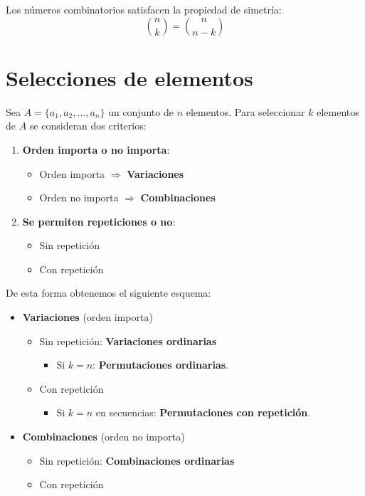 \documentclass[a4paper,12pt]{article}
\begin{document}
\begin{procedimiento}[title=Propiedad de simetría]
Los números combinatorios satisfacen la propiedad de simetría:
\[
\binom{n}{k} = \binom{n}{n-k}
\]
\end{procedimiento}

\section{Selecciones de elementos}

\begin{procedimiento}[title=Selecciones de elementos de un conjunto]
Sea $A = \{a_1, a_2, \dots, a_n\}$ un conjunto de $n$ elementos. Para seleccionar $k$ elementos de $A$ se consideran dos criterios:

\begin{enumerate}
    \item \textbf{Orden importa o no importa}:
    \begin{itemize}
        \item Orden importa $\Rightarrow$ \textbf{Variaciones}
        \item Orden no importa $\Rightarrow$ \textbf{Combinaciones}
    \end{itemize}
    
    \item \textbf{Se permiten repeticiones o no}:
    \begin{itemize}
        \item Sin repetición
        \item Con repetición
    \end{itemize}
\end{enumerate}

De esta forma obtenemos el siguiente esquema:

\begin{itemize}
    \item \textbf{Variaciones} (orden importa)
    \begin{itemize}
        \item Sin repetición: \textbf{Variaciones ordinarias}
        \begin{itemize}
            \item Si $k = n$: \textbf{Permutaciones ordinarias}.
        \end{itemize}
        \item Con repetición
        \begin{itemize}
            \item Si $k = n$ en secuencias: \textbf{Permutaciones con repetición}.
        \end{itemize}
    \end{itemize}
    
    \item \textbf{Combinaciones} (orden no importa)
    \begin{itemize}
        \item Sin repetición: \textbf{Combinaciones ordinarias}
        \item Con repetición
    \end{itemize}
\end{itemize}
\end{procedimiento}
\end{document}
